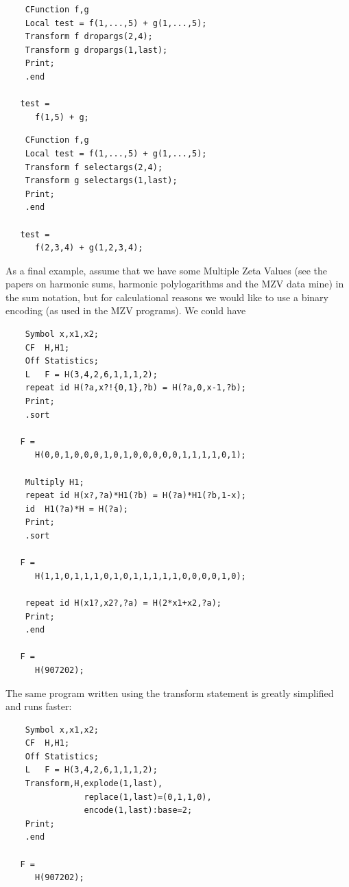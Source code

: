 \begin{verbatim}
    CFunction f,g
    Local test = f(1,...,5) + g(1,...,5);
    Transform f dropargs(2,4);
    Transform g dropargs(1,last);
    Print;
    .end

   test =
      f(1,5) + g;
\end{verbatim}

\begin{verbatim}
    CFunction f,g
    Local test = f(1,...,5) + g(1,...,5);
    Transform f selectargs(2,4);
    Transform g selectargs(1,last);
    Print;
    .end

   test =
      f(2,3,4) + g(1,2,3,4);
\end{verbatim}

As a final example, assume that we have some Multiple Zeta Values (see the papers on harmonic sums, harmonic polylogarithms and the MZV 
data mine) in the sum notation, but for calculational 
reasons we would like to use a binary encoding (as used in the MZV programs). We 
could have
\begin{verbatim}
    Symbol x,x1,x2;
    CF  H,H1;
    Off Statistics;
    L   F = H(3,4,2,6,1,1,1,2);
    repeat id H(?a,x?!{0,1},?b) = H(?a,0,x-1,?b);
    Print;
    .sort

   F =
      H(0,0,1,0,0,0,1,0,1,0,0,0,0,0,1,1,1,1,0,1);

    Multiply H1;
    repeat id H(x?,?a)*H1(?b) = H(?a)*H1(?b,1-x);
    id  H1(?a)*H = H(?a);
    Print;
    .sort

   F =
      H(1,1,0,1,1,1,0,1,0,1,1,1,1,1,0,0,0,0,1,0);

    repeat id H(x1?,x2?,?a) = H(2*x1+x2,?a);
    Print;
    .end

   F =
      H(907202);
\end{verbatim}
The same program written using the transform statement is greatly simplified
and runs faster:
\begin{verbatim}
    Symbol x,x1,x2;
    CF  H,H1;
    Off Statistics;
    L   F = H(3,4,2,6,1,1,1,2);
    Transform,H,explode(1,last),
                replace(1,last)=(0,1,1,0),
                encode(1,last):base=2;
    Print;
    .end

   F =
      H(907202);
\end{verbatim}

